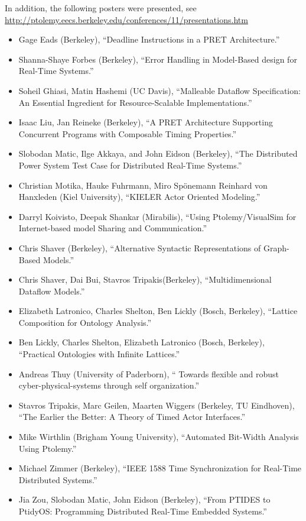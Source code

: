                  In addition, the following posters were presented, see \\
                 \href{http://ptolemy.eecs.berkeley.edu/conferences/11/presentations.htm}{http://ptolemy.eecs.berkeley.edu/conferences/11/presentations.htm}
                 \begin{itemize}
                 \item Gage Eads (Berkeley), ``Deadline Instructions in a PRET Architecture.''
                 \item Shanna-Shaye Forbes (Berkeley), ``Error Handling in Model-Based
                   design for Real-Time Systems.''
                 \item Soheil Ghiasi, Matin Hashemi (UC Davis), ``Malleable Dataflow Specification: An Essential Ingredient for Resource-Scalable Implementations.''
                 \item Isaac Liu, Jan Reineke (Berkeley), ``A PRET Architecture Supporting Concurrent Programs with Composable Timing Properties.''
                 \item Slobodan Matic, Ilge Akkaya, and John Eidson (Berkeley), ``The Distributed Power System Test Case for Distributed Real-Time Systems.''
                 \item Christian Motika, Hauke Fuhrmann, Miro Spönemann Reinhard von
                   Hanxleden (Kiel University), ``KIELER Actor Oriented Modeling.''
                 \item Darryl Koivisto, Deepak Shankar (Mirabilis), ``Using Ptolemy/VisualSim for Internet-based model Sharing and Communication.''
                 \item Chris Shaver (Berkeley), ``Alternative Syntactic Representations of Graph-Based Models.''
                 \item Chris Shaver, Dai Bui, Stavros Tripakis(Berkeley), ``Multidimensional Dataflow Models.''
                 \item Elizabeth Latronico, Charles Shelton, Ben Lickly (Bosch, Berkeley), ``Lattice Composition for Ontology Analysis.''
                 \item Ben Lickly, Charles Shelton, Elizabeth Latronico (Bosch, Berkeley), ``Practical Ontologies with Infinite Lattices.''
                 \item Andreas Thuy (University of Paderborn), `` 	Towards flexible and robust cyber-physical-systems through self organization.''
                 \item Stavros Tripakis, Marc Geilen, Maarten Wiggers (Berkeley, TU
                   Eindhoven), ``The Earlier the Better: A Theory of Timed Actor Interfaces.''
                 \item Mike Wirthlin (Brigham Young University), ``Automated Bit-Width Analysis Using Ptolemy.''
                 \item Michael Zimmer (Berkeley), ``IEEE 1588 Time Synchronization for Real-Time Distributed Systems.''
                 \item Jia Zou, Slobodan Matic, John Eidson (Berkeley), ``From PTIDES
                   to PtidyOS: Programming Distributed Real-Time Embedded Systems.''
                 \end{itemize}



